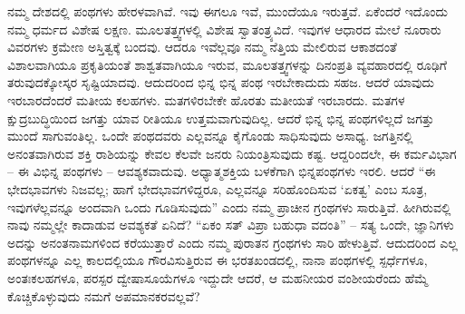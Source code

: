 ನಮ್ಮ ದೇಶದಲ್ಲಿ ಪಂಥಗಳು ಹೇರಳವಾಗಿವೆ. ಇವು ಈಗಲೂ ಇವೆ, ಮುಂದೆಯೂ ಇರುತ್ತವೆ. ಏಕೆಂದರೆ ಇದೊಂದು ನಮ್ಮ ಧರ್ಮದ ವಿಶೇಷ ಲಕ್ಷಣ. ಮೂಲತತ್ತ್ವಗಳಲ್ಲಿ ವಿಶೇಷ ಸ್ವಾತಂತ್ರ್ಯವಿದೆ. ಇವುಗಳ ಆಧಾರದ ಮೇಲೆ ನೂರಾರು ವಿವರಗಳು ಕ್ರಮೇಣ ಅಸ್ತಿತ್ವಕ್ಕೆ ಬಂದವು. ಆದರೂ ಇವೆಲ್ಲವೂ ನಮ್ಮ ನೆತ್ತಿಯ ಮೇಲಿರುವ ಆಕಾಶದಂತೆ ವಿಶಾಲವಾಗಿಯೂ ಪ್ರಕೃತಿಯಂತೆ ಶಾಶ್ವತವಾಗಿಯೂ ಇರುವ, ಮೂಲತತ್ತ್ವಗಳನ್ನು ದಿನಂಪ್ರತಿ ವ್ಯವಹಾರದಲ್ಲಿ ರೂಢಿಗೆ ತರುವುದಕ್ಕೋಸ್ಕರ ಸೃಷ್ಟಿಯಾದವು. ಆದುದರಿಂದ ಭಿನ್ನ ಭಿನ್ನ ಪಂಥ ಇರಬೇಕಾದುದು ಸಹಜ. ಆದರೆ ಯಾವುದು ಇರಬಾರದೆಂದರೆ ಮತೀಯ ಕಲಹಗಳು. ಮತಗಳಿರಬೇಕೇ ಹೊರತು ಮತೀಯತೆ ಇರಬಾರದು. ಮತಗಳ ಕ್ಷುದ್ರಬುದ್ಧಿಯಿಂದ ಜಗತ್ತು ಯಾವ ರೀತಿಯೂ ಉತ್ತಮವಾಗುವುದಿಲ್ಲ. ಆದರೆ ಭಿನ್ನ ಭಿನ್ನ ಪಂಥಗಳಿಲ್ಲದೆ ಜಗತ್ತು ಮುಂದೆ ಸಾಗುವಂತಿಲ್ಲ. ಒಂದೇ ಪಂಥದವರು ಎಲ್ಲವನ್ನೂ ಕೈಗೊಂಡು ಸಾಧಿಸುವುದು ಅಸಾಧ್ಯ. ಜಗತ್ತಿನಲ್ಲಿ ಅನಂತವಾಗಿರುವ ಶಕ್ತಿ ರಾಶಿಯನ್ನು ಕೇವಲ ಕೆಲವೇ ಜನರು ನಿಯಂತ್ರಿಸುವುದು ಕಷ್ಟ. ಆದ್ದರಿಂದಲೇ, ಈ ಕರ್ಮವಿಭಾಗ – ಈ ವಿಭಿನ್ನ ಪಂಥಗಳು – ಆವಶ್ಯಕವಾದುವು. ಅಧ್ಯಾತ್ಮಶಕ್ತಿಯ ಬಳಕೆಗಾಗಿ ಭಿನ್ನಪಂಥಗಳು ಇರಲಿ. ಆದರೆ “ಈ ಭೇದಭಾವಗಳು ನಿಜವಲ್ಲ; ಹಾಗೆ ಭೇದಭಾವಗಳಿದ್ದರೂ, ಎಲ್ಲವನ್ನೂ ಸರಿಹೊಂದಿಸುವ `ಏಕತ್ವ' ಎಂಬ ಸೂತ್ರ, ಇವುಗಳೆಲ್ಲವನ್ನೂ ಅಂದವಾಗಿ ಒಂದು ಗೂಡಿಸುವುದು” ಎಂದು ನಮ್ಮ ಪ್ರಾಚೀನ ಗ್ರಂಥಗಳು ಸಾರುತ್ತಿವೆ. ಹೀಗಿರುವಲ್ಲಿ ನಾವು ನಮ್ಮಲ್ಲೇ ಕಾದಾಡುವ ಅವಶ್ಯಕತೆ ಏನಿದೆ? “ಏಕಂ ಸತ್​ ವಿಪ್ರಾ ಬಹುಧಾ ವದಂತಿ” – ಸತ್ಯ ಒಂದೇ, ಜ್ಞಾನಿಗಳು ಅದನ್ನು ಅನಂತನಾಮಗಳಿಂದ ಕರೆಯುತ್ತಾರೆ ಎಂದು ನಮ್ಮ ಪುರಾತನ ಗ್ರಂಥಗಳು ಸಾರಿ ಹೇಳುತ್ತಿವೆ. ಆದುದರಿಂದ ಎಲ್ಲ ಪಂಥಗಳನ್ನೂ ಎಲ್ಲ ಕಾಲದಲ್ಲಿಯೂ ಗೌರವಿಸುತ್ತಿರುವ ಈ ಭರತಖಂಡದಲ್ಲಿ, ನಾನಾ ಪಂಥಗಳಲ್ಲಿ ಸ್ಪರ್ಧೆಗಳೂ, ಅಂತಃಕಲಹಗಳೂ, ಪರಸ್ಪರ ದ್ವೇಷಾಸೂಯೆಗಳೂ ಇದ್ದುದೇ ಆದರೆ, ಆ ಮಹನೀಯರ ವಂಶೀಯರೆಂದು ಹೆಮ್ಮೆ ಕೊಚ್ಚಿಕೊಳ್ಳುವುದು ನಮಗೆ ಅಪಮಾನಕರವಲ್ಲವೆ?

\vskip 2pt

